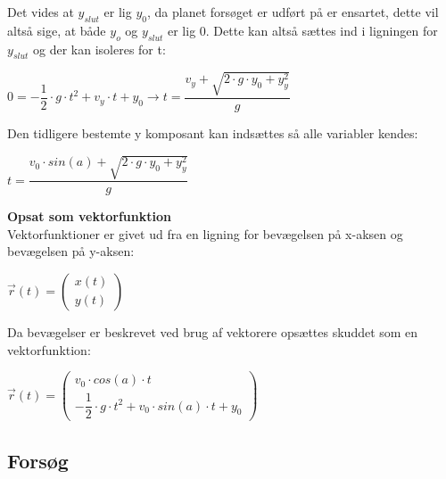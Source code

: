 Det vides at $y_{slut}$ er lig $y_{0}$, da planet forsøget er udført på er ensartet, dette vil altså sige, at både $y_{o}$ og $y_{slut}$ er lig 0. Dette kan altså sættes ind i ligningen for $y_{slut}$ og der kan isoleres for t:\\

\begin{center}
\begin{math}
0 = -\dfrac{1}{2} \cdot g \cdot t^{2} + v_{y} \cdot t + y_{0} \longrightarrow t = \dfrac{v_{y} + \sqrt{2 \cdot g \cdot y_{0} + y^{2}_{y}}}{g}
\end{math}
\end{center}

Den tidligere bestemte y komposant kan indsættes så alle variabler kendes:\\

\begin{center}
\begin{math}
t = \dfrac{v_{0} \cdot sin(a) + \sqrt{2 \cdot g \cdot y_{0} + y^{2}_{y}}}{g}
\end{math}
\end{center}

\textbf{Opsat som vektorfunktion}\\
Vektorfunktioner er givet ud fra en ligning for bevægelsen på x-aksen og bevægelsen på y-aksen:

\begin{center}
\begin{math}
\overrightarrow{r}(t) = 
\begin{pmatrix}
x(t)\\
y(t)
\end{pmatrix}
\end{math}
\end{center}

Da bevægelser er beskrevet ved brug af vektorere opsættes skuddet som en vektorfunktion:

\begin{center}
\begin{math}
\overrightarrow{r}(t) = 
\begin{pmatrix}
v_{0} \cdot cos(a) \cdot t\\
- \dfrac{1}{2} \cdot g \cdot t^{2} + v_{0} \cdot sin(a) \cdot t + y_{0}
\end{pmatrix}
\end{math}
\end{center}

\subsection{Forsøg}
